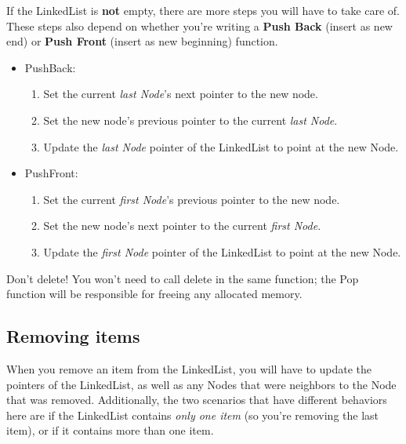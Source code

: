 \documentclass[a4paper,12pt,onepage]{book}
\begin{document}
            If the LinkedList is \textbf{not} empty, there are more steps
            you will have to take care of. These steps also depend on whether
            you're writing a \textbf{Push Back} (insert as new end) 
            or \textbf{Push Front} (insert as new beginning) function.
            
            \begin{itemize}
                \item PushBack:
                \begin{enumerate}
                    \item Set the current \textit{last Node}'s next pointer to the new node.
                    \item Set the new node's previous pointer to the current \textit{last Node}.
                    \item Update the \textit{last Node} pointer of the LinkedList to point at the new Node.
                \end{enumerate}
                
                \item PushFront:
                \begin{enumerate}
                    \item Set the current \textit{first Node}'s previous pointer to the new node.
                    \item Set the new node's next pointer to the current \textit{first Node}.
                    \item Update the \textit{first Node} pointer of the LinkedList to point at the new Node.
                \end{enumerate}
            \end{itemize}
    
    
        \begin{error}{Don't delete!}
        You won't need to call delete in the same function; the Pop function will be responsible for freeing any allocated memory.    
        \end{error}
        
        
    \subsection*{Removing items}
    
        When you remove an item from the LinkedList, you will have to update
        the pointers of the LinkedList, as well as any Nodes that were neighbors
        to the Node that was removed. Additionally, the two scenarios that
        have different behaviors here are if the LinkedList contains 
        \textit{only one item} (so you're removing the last item), or
        if it contains more than one item.
        
\end{document}

